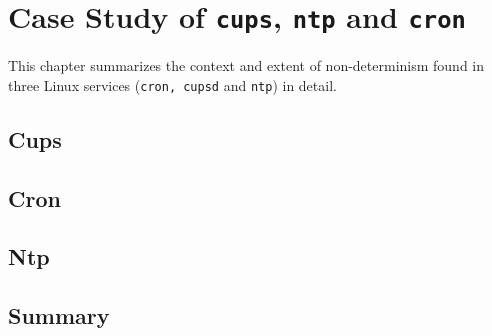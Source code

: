 \chapter{Case Study of \texttt{cups}, \texttt{ntp} and \texttt{cron}} \label{ch:case}
This chapter summarizes the context and extent of non-determinism
found in three Linux services (\texttt{cron, cupsd} and \texttt{ntp}) 
in detail.

\section{Cups}
\section{Cron}
\section{Ntp}

\section {Summary}
